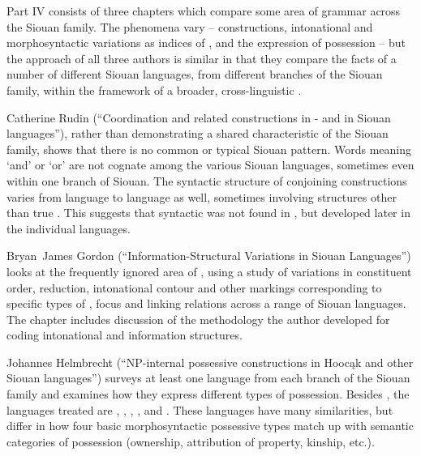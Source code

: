 \begin{refsection}

Part IV consists of three chapters which compare some area of grammar across the Siouan family. The phenomena vary --  constructions, intonational and morphosyntactic variations as indices of , and the expression of possession -- but the approach of all three authors is similar in that they compare the facts of a number of different Siouan languages, from different branches of the Siouan family, within the framework of a broader, cross-linguistic .

Catherine Rudin (``Coordination and related constructions in - and in Siouan languages''), rather than demonstrating a shared characteristic of the Siouan family, shows that there is no common or typical Siouan  pattern. Words meaning `and' or `or' are not cognate among the various Siouan languages, sometimes even within one branch of Siouan. The syntactic structure of conjoining constructions varies from language to language as well, sometimes involving structures other than true . This suggests that syntactic  was not found in , but developed later in the individual languages.

Bryan~James Gordon (``Information-Structural Variations in Siouan Languages'') looks at the frequently ignored area of , using a  study of variations in constituent order, reduction, intonational contour and other markings corresponding to specific types of , focus and linking relations across a range of Siouan languages. The chapter includes discussion of the methodology the author developed for coding intonational and information structures.


Johannes Helmbrecht (``NP-internal possessive constructions in Hooc\k{a}k and other Siouan languages'') surveys at least one language from each branch of the Siouan family and examines how they express different types of possession. Besides , the languages treated are , , , ,  and . These languages have many similarities, but differ in how four basic morphosyntactic possessive types match up with semantic categories of possession (ownership, attribution of property, kinship, etc.).


 
\end{refsection}

